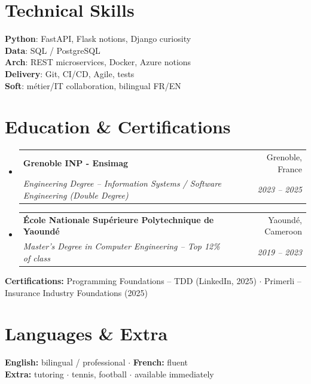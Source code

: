 \documentclass[letterpaper,10.5pt]{article}
\makeatletter
\newcommand{\resumeSubheading}[4]{\vspace{-1pt}\item\begin{tabular*}{0.97\textwidth}[t]{l@{\extracolsep{\fill}}r}\textbf{#1} & #2 \\\textit{\small#3} & \textit{\small #4} \\\end{tabular*}\vspace{-5pt}}
\newcommand{\resumeSubHeadingListStart}{\begin{itemize}[leftmargin=0.15in, label={}]}
\newcommand{\resumeSubHeadingListEnd}{\end{itemize}}
\makeatother
\begin{document}
\section{Technical Skills}
\begin{itemize}[leftmargin=0.15in, label={}]\small{\item{\textbf{Python}: FastAPI, Flask notions, Django curiosity \\ \textbf{Data}: SQL / PostgreSQL \\ \textbf{Arch}: REST microservices, Docker, Azure notions \\ \textbf{Delivery}: Git, CI/CD, Agile, tests \\ \textbf{Soft}: m\'etier/IT collaboration, bilingual FR/EN}}\end{itemize}
\section{Education \& Certifications}
\resumeSubHeadingListStart
  \resumeSubheading{Grenoble INP - Ensimag}{Grenoble, France}{Engineering Degree -- Information Systems / Software Engineering (Double Degree)}{2023 -- 2025}
  \resumeSubheading{\'Ecole Nationale Sup\'erieure Polytechnique de Yaound\'e}{Yaound\'e, Cameroon}{Master's Degree in Computer Engineering -- Top 12\% of class}{2019 -- 2023}
\resumeSubHeadingListEnd
\small{\textbf{Certifications:} Programming Foundations -- TDD (LinkedIn, 2025) $\cdot$ Primerli -- Insurance Industry Foundations (2025)}
\section{Languages \& Extra}
\small{\textbf{English:} bilingual / professional $\cdot$ \textbf{French:} fluent \\ \textbf{Extra:} tutoring $\cdot$ tennis, football $\cdot$ available immediately}
\end{document}
